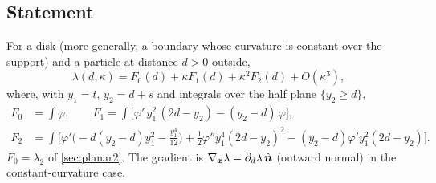 \subsection{Statement}
\begin{theorem}\label{thm:curv}
For a disk (more generally, a boundary whose curvature is constant over the support) and a particle at distance $d>0$ outside,
\begin{equation}\label{eq:curv}
 \lambda(d,\kappa)=F_0(d)+\kappa F_1(d)+\kappa^2F_2(d)+O(\kappa^3),
\end{equation}
where, with $y_1=t$, $y_2=d+s$ and integrals over the half plane $\{y_2\ge d\}$,
\begin{align}
 F_0&=\int\varphi,\qquad F_1=\int\Big[\varphi'\,y_1^2\,(2d-y_2)-(y_2-d)\,\varphi\Big],\\
 F_2&=\int\Big[\varphi'\big(-d(y_2-d)y_1^2-\tfrac{y_1^4}{12}\big)+\tfrac12\varphi''y_1^4(2d-y_2)^2-(y_2-d)\varphi'y_1^2(2d-y_2)\Big].
\end{align}
$F_0=\lambda_2$ of \cref{sec:planar2}. The gradient is $\nabla_{\bm x}\lambda=\partial_d\lambda\,\hat{\bm n}$ (outward normal) in the constant-curvature case.
\end{theorem}
